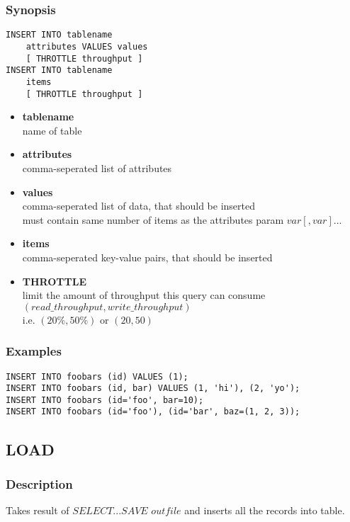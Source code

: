 \subsubsection{Synopsis}
\lstset{language=Java}
\begin{lstlisting}
INSERT INTO tablename
    attributes VALUES values
    [ THROTTLE throughput ]
INSERT INTO tablename
    items
    [ THROTTLE throughput ]	
\end{lstlisting}

\begin{itemize}
	\item \textbf{tablename} \\
	name of table
	\item \textbf{attributes} \\
	comma-seperated list of attributes
	\item \textbf{values} \\
	comma-seperated list of data, that should be inserted\\
	must contain same number of items as the attributes param
	$var [, var]...$ 
	\item \textbf{items} \\
	comma-seperated key-value pairs, that should be inserted
	\item \textbf{THROTTLE} \\
	limit the amount of throughput this query can consume\\
	$(read\_throughput, write\_throughput)$\\
	i.e. $(20\%, 50\%)$ or $(20, 50)$
\end{itemize}

\subsubsection{Examples}
\lstset{language=Java}
\begin{lstlisting}
INSERT INTO foobars (id) VALUES (1);
INSERT INTO foobars (id, bar) VALUES (1, 'hi'), (2, 'yo');
INSERT INTO foobars (id='foo', bar=10);
INSERT INTO foobars (id='foo'), (id='bar', baz=(1, 2, 3));	
\end{lstlisting}
\vspace{40pt}

\subsection{LOAD}
\subsubsection{Description}
Takes result of $SELECT ... SAVE$ $outfile$ and inserts all the records into table.

